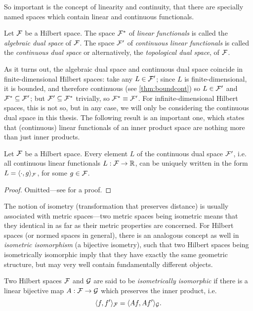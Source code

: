So important is the concept of linearity and continuity, that there are specially named spaces which contain linear and continuous functionals.

\begin{definition}
  Let ${\mathcal F}$ be a Hilbert space. 
  The space ${\mathcal F}^*$ of \emph{linear functionals} is called the \emph{algebraic dual space} of ${\mathcal F}$.
  The space ${\mathcal F}'$ of \emph{continuous linear functionals} is called the \emph{continuous dual space} or alternatively, the \emph{topological dual space}, of ${\mathcal F}$.   
\end{definition}

As it turns out, the algebraic dual space and continuous dual space coincide in finite-dimensional Hilbert spaces:
take any $L\in{\mathcal F}'$; since $L$ is finite-dimensional, it is bounded, and therefore continuous (see \cref{thm:boundcont}) so $L\in{\mathcal F}'$ and ${\mathcal F}^* \subseteq {\mathcal F}'$; but ${\mathcal F}' \subseteq {\mathcal F}^*$ trivially, so ${\mathcal F}^* \equiv {\mathcal F}'$.
For infinite-dimensional Hilbert spaces, this is not so, but in any case, we will only be considering the continuous dual space in this thesis.
The following result is an important one, which states that (continuous) linear functionals of an inner product space are nothing more than just inner products.

\begin{theorem}
  Let ${\mathcal F}$ be a Hilbert space.
  Every element $L$ of the continuous dual space ${\mathcal F}'$, i.e. all continuous linear functionals $L:{\mathcal F}\to\mathbb{R}$, can be uniquely written in the form $L=\langle\cdot,g\rangle_{\mathcal F}$, for some $g\in{\mathcal F}$.
\end{theorem}

\begin{proof}
  Omitted---see \citet[Theorem 4.12]{rudin1987real} for a proof.
\end{proof}

The notion of isometry (transformation that preserves distance) is usually associated with metric spaces---two metric spaces being isometric means that they identical in as far as their metric properties are concerned.
For Hilbert spaces (or normed spaces in general), there is an analogous concept as well in \emph{isometric isomorphism} (a bijective isometry), such that two Hilbert spaces being isometrically isomorphic imply that they have exactly the same geometric structure, but may very well contain fundamentally different objects.

\begin{definition}
  Two Hilbert spaces ${\mathcal F}$ and ${\mathcal G}$ are said to be \emph{isometrically isomorphic} if there is a linear bijective map $A:{\mathcal F}\to{\mathcal G}$ which preserves the inner product, i.e. 
  \[
    \langle f,f'\rangle_{\mathcal F} = \langle Af,Af'\rangle_{\mathcal G}.
  \]
\end{definition}

